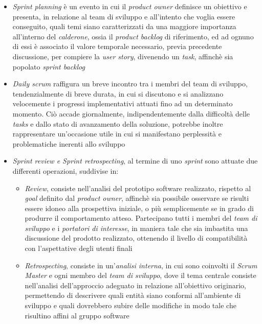 \documentclass{article}
\begin{document}
\begin{itemize}[label={-}]
    \itemsep0em
    \item \textit{Sprint planning} è un evento in cui il \textit{product owner} definisce un obiettivo e presenta, in relazione al team di sviluppo e all'intento che voglia essere conseguito, quali temi siano caratterizzati da una maggiore importanza all'interno del \textit{calderone}, ossia il \textit{product backlog} di riferimento, ed ad ognuno di essi è associato il valore temporale necessario, previa precedente discussione, per compiere la \textit{user story}, divenendo un \textit{task}, affinchè sia popolato \textit{sprint backlog}
    \item \textit{Daily scrum} raffigura un breve incontro tra i membri del team di sviluppo, tendenzialmente di breve durata, in cui si discutono e si analizzano velocemente i progressi implementativi attuati fino ad un determinato momento. Ciò accade giornalmente, indipendentemente dalla difficoltà delle \textit{tasks} e dallo stato di avanzamento della soluzione, potrebbe inoltre rappresentare un'occasione utile in cui si manifestano perplessità e problematiche inerenti allo sviluppo 
    \item \textit{Sprint review e Sprint retrospecting}, al termine di uno \textit{sprint} sono attuate due differenti operazioni, suddivise in: \begin{itemize}[label={-}]
                                                                                                                                                    \itemsep0em
                                                                                                                                                    \item \textit{Review}, consiste nell'analisi del prototipo software realizzato, rispetto al \textit{goal} definito dal \textit{product owner}, affinchè sia possibile osservare se risulti essere idoneo alla prospettiva iniziale, o più semplicemente se in grado di produrre il comportamento atteso. Partecipano tutti i membri del \textit{team di sviluppo} e i \textit{portatori di interesse}, in maniera tale che sia imbastita una discussione del prodotto realizzato, ottenendo il livello di compatibilità con l'aspettative degli utenti finali
                                                                                                                                            \item \textit{Retrospecting}, consiste in un'\textit{analisi interna}, in cui sono coinvolti il \textit{Scrum Master} e ogni membro del \textit{team di sviluppo}, dove il tema centrale consiste nell'analisi dell'approccio adeguato in relazione all'obiettivo originario, permettendo di descrivere quali entità siano conformi all'ambiente di sviluppo e quali dovrebbero subire delle modifiche in modo tale che risultino affini al gruppo software
                                                                                                                                                \end{itemize}
\end{itemize}
\end{document}
